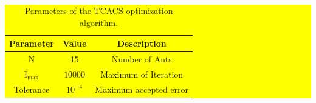 \documentclass[3p]{elsarticle}
\begin{document}

\begin{table}[H]
    \centering
    \colorbox{yellow}{ %
    \begin{minipage}{\linewidth} %
        \caption{Parameters of the TCACS optimization algorithm.}
        \renewcommand{\arraystretch}{1.3}
        \centering
        \begin{tabular}{@{}ccc@{}}
        \toprule
        Parameter & Value & Description \\
        \midrule
        N & 15 & Number of Ants\\
        $\mathrm{I}_{\max}$ & $10000$ & Maximum of Iteration \\
        Tolerance &	$10^{-4}$ &	Maximum accepted error \\
        \bottomrule
        \end{tabular}
        \label{tab:TCAC_par}
    \end{minipage}
    }
\end{table}
\end{document}
